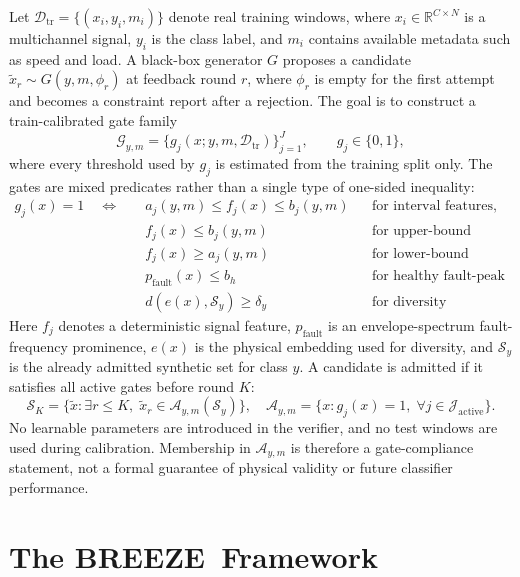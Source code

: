 \documentclass[review,3p,times]{elsarticle}
\newcommand{\breeze}{BREEZE}
\begin{document}
Let $\mathcal{D}_{\mathrm{tr}}=\{(x_i,y_i,m_i)\}$ denote real training
windows, where $x_i\in\mathbb{R}^{C\times N}$ is a multichannel signal,
$y_i$ is the class label, and $m_i$ contains available metadata such as speed
and load. A black-box generator $G$ proposes a candidate
$\tilde{x}_{r}\sim G(y,m,\phi_r)$ at feedback round $r$, where $\phi_r$ is
empty for the first attempt and becomes a constraint report after a rejection.
The goal is to construct a train-calibrated gate family
\begin{equation}
  \mathcal{G}_{y,m}=\{g_j(x;y,m,\mathcal{D}_{\mathrm{tr}})\}_{j=1}^{J},
  \qquad g_j\in\{0,1\},
\end{equation}
where every threshold used by $g_j$ is estimated from the training split only.
The gates are mixed predicates rather than a single type of one-sided
inequality:
\begin{equation}
\begin{aligned}
g_j(x)=1 \quad \Longleftrightarrow \quad
&a_j(y,m)\leq f_j(x)\leq b_j(y,m) && \text{for interval features,}\\
&f_j(x)\leq b_j(y,m)                  && \text{for upper-bound tests,}\\
&f_j(x)\geq a_j(y,m)                  && \text{for lower-bound evidence,}\\
&p_{\mathrm{fault}}(x)\leq b_h        && \text{for healthy fault-peak suppression,}\\
&d(e(x),\mathcal{S}_{y})\geq \delta_y && \text{for diversity admission.}
\end{aligned}
\end{equation}
Here $f_j$ denotes a deterministic signal feature, $p_{\mathrm{fault}}$ is an
envelope-spectrum fault-frequency prominence, $e(x)$ is the physical embedding
used for diversity, and $\mathcal{S}_{y}$ is the already admitted synthetic
set for class $y$. A candidate is admitted if it satisfies all active gates
before round $K$:
\begin{equation}
  \mathcal{S}_{K}=\{\tilde{x}: \exists r\leq K,\;\tilde{x}_r\in
  \mathcal{A}_{y,m}(\mathcal{S}_{y})\},\quad
  \mathcal{A}_{y,m}=\{x:g_j(x)=1,\;\forall j\in\mathcal{J}_{\mathrm{active}}\}.
\end{equation}
No learnable parameters are introduced in the verifier, and no test windows
are used during calibration. Membership in $\mathcal{A}_{y,m}$ is therefore a
gate-compliance statement, not a formal guarantee of physical validity or
future classifier performance.

\section{The \breeze\ Framework}
\label{sec:method}
\end{document}
